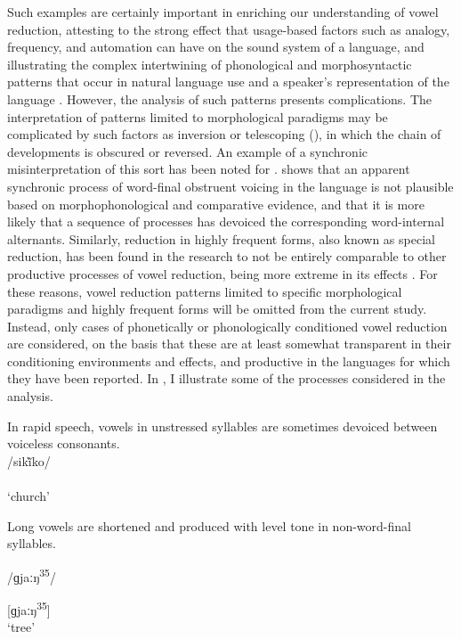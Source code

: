   Such examples are certainly important in enriching our understanding of vow\-el reduction, attesting to the strong effect that usage-based factors such as analogy, frequency, and automation can have on the sound system of a language, and illustrating the complex intertwining of phonological and morphosyntactic patterns that occur in natural language use and a speaker’s representation of the language \citep{Bybee2001}. However, the analysis of such patterns presents complications. The interpretation of patterns limited to morphological paradigms may be complicated by such factors as inversion or telescoping (\citealt{Vennemann1972,Hyman1975}), in which the chain of developments is obscured or reversed. An example of a synchronic misinterpretation of this sort has been noted for . \citet{Yu2004} shows that an apparent synchronic process of word-final obstruent voicing in the language is not plausible based on morphophonological and comparative evidence, and that it is more likely that a sequence of processes has devoiced the corresponding word-internal alternants. Similarly, reduction in highly frequent forms, also known as special reduction, has been found in the research to not be entirely comparable to other productive processes of vowel reduction, being more extreme in its effects \citep{BybeeEtAl2016}. For these reasons, vowel reduction patterns limited to specific morphological paradigms and highly frequent forms will be omitted from the current study. Instead, only cases of phonetically or phonologically conditioned vowel reduction are considered, on the basis that these are at least somewhat transparent in their conditioning environments and effects, and productive in the languages for which they have been reported. In , I illustrate some of the processes considered in the analysis.

\ea\label{ex:6.6}
In rapid speech, vowels in unstressed syllables are sometimes devoiced between voiceless consonants.\\
/sik\`{ĩ}ko/\\\relax
[si̥k\`{ĩ}ko]\\
\glt ‘church’
\citep[18]{Holt1999}
\z

\ea\label{ex:6.7}

Long vowels are shortened and produced with level tone in non-word-final syllables. 

\ea  /ɡjaːŋ\textsuperscript{35}/

[ɡjaːŋ\textsuperscript{35}]\\
\glt ‘tree’

